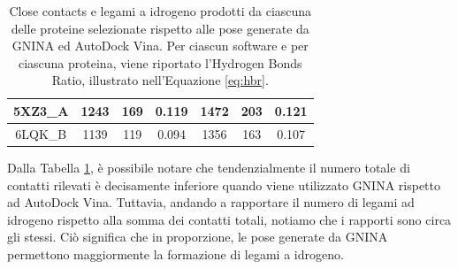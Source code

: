\begin{table}[H]
{\begin{tabular}{ccccccc}
5XZ3\_A                                                           & \multicolumn{1}{c}{1243}                                                                                              & \multicolumn{1}{c}{169}                                                                                                & 0.119                                                                             & \multicolumn{1}{c}{1472}                                                                                              & \multicolumn{1}{c}{203}                                                                                                & 0.121                                                                             \\ \midrule
6LQK\_B                                                           & \multicolumn{1}{c}{1139}                                                                                              & \multicolumn{1}{c}{119}                                                                                                & 0.094                                                                             & \multicolumn{1}{c}{1356}                                                                                              & \multicolumn{1}{c}{163}                                                                                                & 0.107                                                                             \\ \bottomrule
\end{tabular}%
}
\caption[Interazioni nel complesso proteina-ligando generato da GNINA e AutoDock Vina.]{Close contacts e legami a idrogeno prodotti da ciascuna delle proteine selezionate rispetto alle pose generate da GNINA ed AutoDock Vina. Per ciascun software e per ciascuna proteina, viene riportato l'Hydrogen Bonds Ratio, illustrato nell'Equazione \ref{eq:hbr}.}
\label{contacts_table}
\end{table}

Dalla Tabella \ref{contacts_table}, è possibile notare che tendenzialmente il numero totale di contatti rilevati è decisamente inferiore quando viene utilizzato GNINA rispetto ad AutoDock Vina. Tuttavia, andando a rapportare il numero di legami ad idrogeno rispetto alla somma dei contatti totali, notiamo che i rapporti sono circa gli stessi. Ciò significa che in proporzione, le pose generate da GNINA permettono maggiormente la formazione di legami a idrogeno. 

